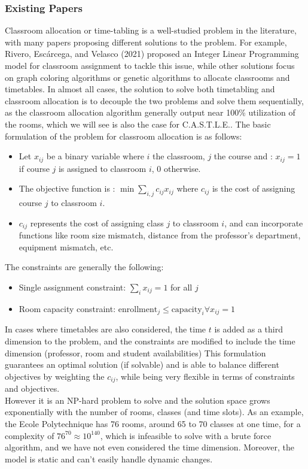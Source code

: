 \documentclass[a4paper, oneside]{article}
\theoremstyle{plain}
\newcommand{\castle}{C{\small.}A{\small.}S{\small.}T{\small.}L{\small.}E{\small.}}
\begin{document}
\subsubsection{Existing Papers}
Classroom allocation or time-tabling is a well-studied problem in the literature, with many papers proposing different solutions to the problem.
For example, Rivero, Escárcega, and Velasco (2021) proposed an Integer Linear Programming model for classroom assignment to tackle this issue, while other solutions
focus on graph coloring algorithms or genetic algorithms to allocate classrooms and timetables. In almost all cases, the solution to solve both
timetabling and classroom allocation is to decouple the two problems and solve them sequentially, as the classroom allocation algorithm generally output near 100\% utilization of the rooms,
which we will see is also the case for \castle{}.
The basic formulation of the problem for classroom allocation is as follows:
\begin{itemize}
	\item Let $x_{ij}$ be a binary variable where $i$ the classroom, $j$ the course and : $x_{ij} = 1$ if course $j$ is assigned to classroom $i$, $0$ otherwise.
	\item The objective function is : $\min \sum_{i,j} c_{ij}x_{ij}$ where $c_{ij}$ is the cost of assigning course $j$ to classroom $i$.
	\item $c_{ij}$ represents the cost of assigning class $j$ to classroom $i$, and can incorporate functions like room size mismatch, distance from the professor's department, equipment mismatch, etc.
\end{itemize}
The constraints are generally the following:
\begin{itemize}
	\item Single assignment constraint: $\sum_{i} x_{ij} = 1$ for all $j$
	\item Room capacity constraint: $\text{enrollment}_j \leq \text{capacity}_i \forall x_{ij} = 1$
\end{itemize}
In cases where timetables are also considered, the time $t$ is added as a third dimension to the problem, and the constraints are modified to include the time dimension (professor, room and student availabilities)
This formulation guarantees an optimal solution (if solvable) and is able to balance different objectives by weighting the $c_{ij}$, while being very flexible in terms of constraints and objectives.\\

However it is an NP-hard problem to solve and the solution space grows exponentially with the number of rooms, classes (and time slots). As an example, the Ecole Polytechnique has 76 rooms, around 65 to 70 classes at one time, for a complexity of $76^{70} \approx 10^{140}$, which is infeasible to solve with a brute force algorithm,
and we have not even considered the time dimension. Moreover, the model is static and can't easily handle dynamic changes.
\end{document}
